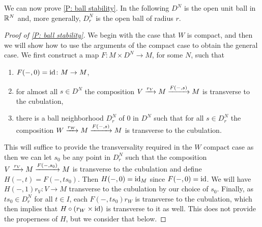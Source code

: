 We can now prove \cref{P: ball stability}.
In the following $D^N$ is the open unit ball in $\mathbb{R}^N$ and, more generally, $D^N_r$ is the open ball of radius $r$.

\begin{proof}[Proof of \cref{P: ball stability}]
	We begin with the case that $W$ is compact, and then we will show how to use the arguments of the compact case to obtain the general case.
	We first construct a map $F \colon M \times D^N \to M$, for some $N$, such that

	\begin{enumerate}
		\item $F(-,0) = \mathrm{id} \colon M \to M$,
		\item for almost all $s \in D^N$ the composition $V \xrightarrow{r_V} M \xrightarrow{F(-,s)}M$ is transverse to the cubulation,
		\item there is a ball neighborhood $D_r^N$ of $0$ in $D^N$ such that for all $s \in D_r^N$ the composition $W \xrightarrow{r_W} M \xrightarrow{F(-,s)}M$ is transverse to the cubulation.
	\end{enumerate}

	This will suffice to provide the transversality required in the $W$ compact case as then we can let $s_0$ be any point in $D_r^N$ such that the composition $V \xrightarrow{r_V} M \xrightarrow{F(-,s_0)}M$ is transverse to the cubulation and define $H(-,t) = F(-,ts_0)$.
	Then $H(-,0) = \mathrm{id}_M$ since $F(-,0) = \mathrm{id}$.
	We will have $H(-,1) r_V \colon V \to M$ transverse to the cubulation by our choice of $s_0$.
	Finally, as $ts_0 \in D_r^N$ for all $t \in I$, each $F(-,ts_0)r_W$ is transverse to the cubulation, which then implies that $H \circ (r_{W} \times \mathrm{id})$ is transverse to it as well.
	This does not provide the properness of $H$, but we consider that below.
	\begin{comment}Furthermore, for $V$ compact any map and homotopy are proper, and this homotopy is universal as it can be decomposed into $r_V \colon V \times I \to M \times I$ and the homotopy $M \times I \to M$ taking $(z,t)$ to $F(z,ts_0)$.
	\end{comment}


\end{proof}
